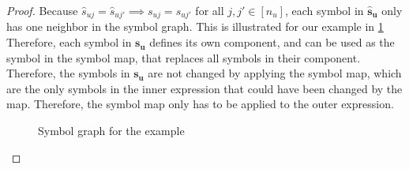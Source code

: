 \begin{proof}
    \small
    Because $\hat{s}_{uj} = \hat{s}_{uj'} \implies s_{uj} = s_{uj'}$ for all $j, j' \in [n_u]$,
    each symbol in $\bm{\hat{s}_u}$ only has one neighbor in the symbol graph.
    This is illustrated for our example in \cref{fig:nested_expressions:example_symbol_graph_remove}
    Therefore, each symbol in $\bm{s_u}$ defines its own component,
    and can be used as the symbol in the symbol map, that replaces all symbols in their component.
    Therefore, the symbols in $\bm{s_u}$ are not changed by applying the symbol map, which are the only symbols in the inner expression that could have been changed by the map.
    Therefore, the symbol map only has to be applied to the outer expression.

    \begin{figure}[h]
        \centering
        \caption{Symbol graph for the example}
        \label{fig:nested_expressions:example_symbol_graph_remove}
    \end{figure}
\end{proof}
\bigskip